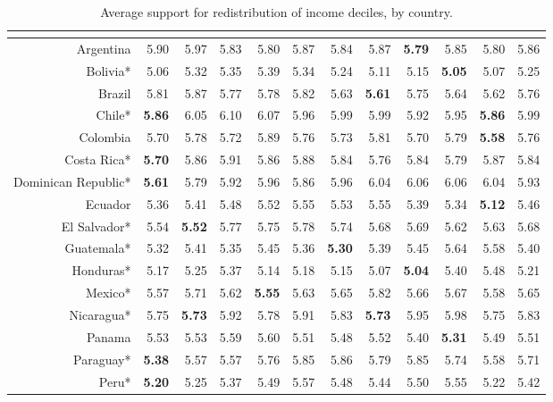 \documentclass[utf8]{frontiersSCNS} %
\begin{document}
\begin{table} [h]
\small\sf\centering
	\caption{Average support for redistribution of income deciles, by country.}
	\label{tab2}
		\begin{tabular} {rrrrrrrrrrrr}
			\multicolumn{ 12 }{l}{ } \cr
			\toprule
			& D1 & D2 & D3 & D4 & D5 & D6 & D7 & D8 & D9 & D10 & Total \\
			\midrule
  Argentina & 5.90 & 5.97 & 5.83 & 5.80 & 5.87 & 5.84 & 5.87 & \textbf{5.79} & 5.85 & 5.80 & 5.86 \\
  Bolivia* & 5.06 & 5.32 & 5.35 & 5.39 & 5.34 & 5.24 & 5.11 & 5.15 & \textbf{5.05} & 5.07 & 5.25 \\
  Brazil & 5.81 & 5.87 & 5.77 & 5.78 & 5.82 & 5.63 & \textbf{5.61} & 5.75 & 5.64 & 5.62 & 5.76 \\
  Chile* & \textbf{5.86} & 6.05 & 6.10 & 6.07 & 5.96 & 5.99 & 5.99 & 5.92 & 5.95 & \textbf{5.86} & 5.99 \\
  Colombia & 5.70 & 5.78 & 5.72 & 5.89 & 5.76 & 5.73 & 5.81 & 5.70 & 5.79 & \textbf{5.58} & 5.76 \\
  Costa Rica* & \textbf{5.70} & 5.86 & 5.91 & 5.86 & 5.88 & 5.84 & 5.76 & 5.84 & 5.79 & 5.87 & 5.84 \\
  Dominican Republic* & \textbf{5.61} & 5.79 & 5.92 & 5.96 & 5.86 & 5.96 & 6.04 & 6.06 & 6.06 & 6.04 & 5.93 \\
  Ecuador & 5.36 & 5.41 & 5.48 & 5.52 & 5.55 & 5.53 & 5.55 & 5.39 & 5.34 & \textbf{5.12} & 5.46 \\
  El Salvador* & 5.54 & \textbf{5.52} & 5.77 & 5.75 & 5.78 & 5.74 & 5.68 & 5.69 & 5.62 & 5.63 & 5.68 \\
  Guatemala* & 5.32 & 5.41 & 5.35 & 5.45 & 5.36 & \textbf{5.30} & 5.39 & 5.45 & 5.64 & 5.58 & 5.40 \\
  Honduras* & 5.17 & 5.25 & 5.37 & 5.14 & 5.18 & 5.15 & 5.07 & \textbf{5.04} & 5.40 & 5.48 & 5.21 \\
  Mexico* & 5.57 & 5.71 & 5.62 & \textbf{5.55} & 5.63 & 5.65 & 5.82 & 5.66 & 5.67 & 5.58 & 5.65 \\
  Nicaragua* & 5.75 & \textbf{5.73} & 5.92 & 5.78 & 5.91 & 5.83 & \textbf{5.73} & 5.95 & 5.98 & 5.75 & 5.83 \\
  Panama & 5.53 & 5.53 & 5.59 & 5.60 & 5.51 & 5.48 & 5.52 & 5.40 & \textbf{5.31} & 5.49 & 5.51 \\
  Paraguay* & \textbf{5.38} & 5.57 & 5.57 & 5.76 & 5.85 & 5.86 & 5.79 & 5.85 & 5.74 & 5.58 & 5.71 \\
  Peru* & \textbf{5.20} & 5.25 & 5.37 & 5.49 & 5.57 & 5.48 & 5.44 & 5.50 & 5.55 & 5.22 & 5.42 \\

\end{tabular}
\end{table}
\end{document}
